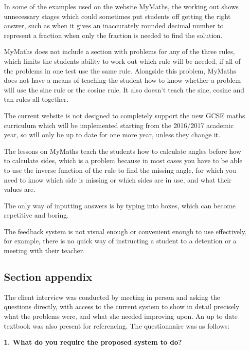 In some of the examples used on the website MyMaths, the working out shows unnecessary stages which could sometimes put students off getting the right answer, such as when it gives an inaccurately rounded decimal number to represent a fraction when only the fraction is needed to find the solution.

MyMaths does not include a section with problems for any of the three rules, which limits the students ability to work out which rule will be needed, if all of the problems in one test use the same rule. Alongside this problem, MyMaths does not have a means of teaching the student how to know whether a problem will use the sine rule or the cosine rule. It also doesn't teach the sine, cosine and tan rules all together.

The current website is not designed to completely support the new GCSE maths curriculum which will be implemented starting from the 2016/2017 academic year, so will only be up to date for one more year, unless they change it.

The lessons on MyMaths teach the students how to calculate angles before how to calculate sides, which is a problem because in most cases you have to be able to use the inverse function of the rule to find the missing angle, for which you need to know which side is missing or which sides are in use, and what their values are.

The only way of inputting answers is by typing into boxes, which can become repetitive and boring.

The feedback system is not visual enough or convenient enough to use effectively, for example, there is no quick way of instructing a student to a detention or a meeting with their teacher.

\subsection{Section appendix}

The client interview was conducted by meeting in person and asking the questions directly, with access to the current system to show in detail precisely what the problems were, and what she needed improving upon. An up to date textbook was also present for referencing. The questionnaire was as follows:

\textbf{1. What do you require the proposed system to do?}

